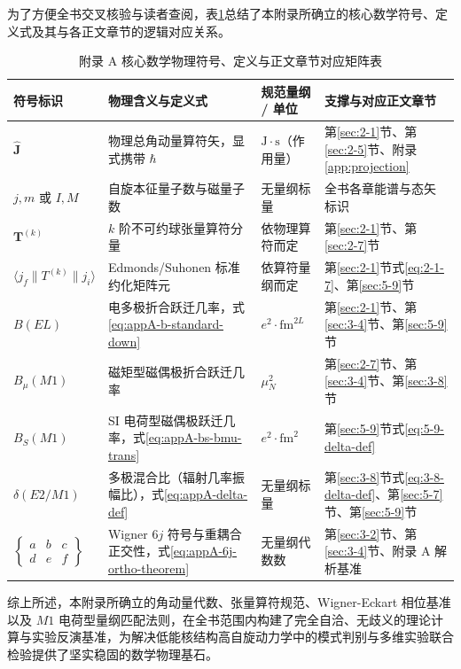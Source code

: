 为了方便全书交叉核验与读者查阅，表\ref{tab:appA-alignment-matrix}总结了本附录所确立的核心数学符号、定义式及其与各正文章节的逻辑对应关系。

\begin{table}[htbp]
\centering
\small
\caption{附录 A 核心数学物理符号、定义与正文章节对应矩阵表}\label{tab:appA-alignment-matrix}
\begin{tabularx}{\textwidth}{p{2.5cm} p{4.5cm} p{2.2cm} >{\raggedright\arraybackslash}X}
\toprule
符号标识 & 物理含义与定义式 & 规范量纲 / 单位 & 支撑与对应正文章节 \\
\midrule
$\hat{\mathbf{J}}$ & 物理总角动量算符矢，显式携带 $\hbar$ & $\mathrm{J}\cdot\mathrm{s}$（作用量） & 第\ref{sec:2-1}节、第\ref{sec:2-5}节、附录\ref{app:projection} \\
\addlinespace
$j, m$ 或 $I, M$ & 自旋本征量子数与磁量子数 & 无量纲标量 & 全书各章能谱与态矢标识 \\
\addlinespace
$\mathbf{T}^{(k)}$ & $k$ 阶不可约球张量算符分量 & 依物理算符而定 & 第\ref{sec:2-1}节、第\ref{sec:2-7}节 \\
\addlinespace
$\langle j_f \| T^{(k)} \| j_i \rangle$ & Edmonds/Suhonen 标准约化矩阵元 & 依算符量纲而定 & 第\ref{sec:2-1}节式\eqref{eq:2-1-7}、第\ref{sec:5-9}节 \\
\addlinespace
$B(EL)$ & 电多极折合跃迁几率，式\eqref{eq:appA-b-standard-down} & $e^2\cdot\mathrm{fm}^{2L}$ & 第\ref{sec:2-1}节、第\ref{sec:3-4}节、第\ref{sec:5-9}节 \\
\addlinespace
$B_\mu(M1)$ & 磁矩型磁偶极折合跃迁几率 & $\mu_N^2$ & 第\ref{sec:2-7}节、第\ref{sec:3-4}节、第\ref{sec:3-8}节 \\
\addlinespace
$B_S(M1)$ & SI 电荷型磁偶极跃迁几率，式\eqref{eq:appA-bs-bmu-trans} & $e^2\cdot\mathrm{fm}^2$ & 第\ref{sec:5-9}节式\eqref{eq:5-9-delta-def} \\
\addlinespace
$\delta(E2/M1)$ & 多极混合比（辐射几率振幅比），式\eqref{eq:appA-delta-def} & 无量纲标量 & 第\ref{sec:3-8}节式\eqref{eq:3-8-delta-def}、第\ref{sec:5-7}节、第\ref{sec:5-9}节 \\
\addlinespace
$\begin{Bmatrix} a & b & c \\ d & e & f \end{Bmatrix}$ & Wigner $6j$ 符号与重耦合正交性，式\eqref{eq:appA-6j-ortho-theorem} & 无量纲代数数 & 第\ref{sec:3-2}节、第\ref{sec:3-4}节、附录 A 解析基准 \\
\bottomrule
\end{tabularx}
\end{table}

综上所述，本附录所确立的角动量代数、张量算符规范、Wigner-Eckart 相位基准以及 $M1$ 电荷型量纲匹配法则，在全书范围内构建了完全自洽、无歧义的理论计算与实验反演基准，为解决低能核结构高自旋动力学中的模式判别与多维实验联合检验提供了坚实稳固的数学物理基石。
